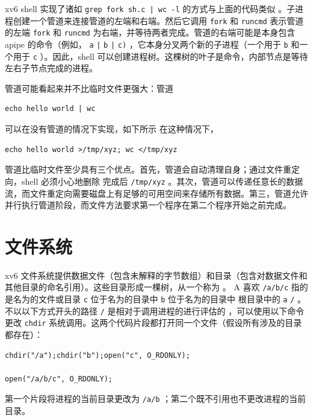 \documentclass[UTF8]{article}
\begin{document}
xv6 shell 实现了诸如
    \lstinline{grep fork sh.c | wc -l}    的方式与上面的代码类似
        。子进程创建一个管道来连接管道的左端和右端。然后它调用
    \lstinline{fork}    和
    \lstinline{runcmd}    表示管道的左端
    \lstinline{fork}    和
    \lstinline{runcmd}    为右端，并等待两者完成。管道的右端可能是本身包含 apipe 的命令（例如，
    \lstinline{a}   
    \lstinline{|}   
    \lstinline{b}   
    \lstinline{|}   
    \lstinline{c)}    ，它本身分叉两个新的子进程（一个用于
    \lstinline{b}    和一个用于
    \lstinline{c}    ）。因此，shell 可以创建进程树。这棵树的叶子是命令，内部节点是等待左右子节点完成的进程。  

管道可能看起来并不比临时文件更强大：管道
    \begin{lstlisting}[]echo hello world | wc
\end{lstlisting}    可以在没有管道的情况下实现，如下所示
 在这种情况下，   \begin{lstlisting}[]echo hello world >/tmp/xyz; wc </tmp/xyz
\end{lstlisting}    管道比临时文件至少具有三个优点。首先，管道会自动清理自身；通过文件重定向，shell 必须小心地删除
 完成后    \lstinline{/tmp/xyz}   。其次，管道可以传递任意长的数据流，而文件重定向需要磁盘上有足够的可用空间来存储所有数据。第三，管道允许并行执行管道阶段，而文件方法要求第一个程序在第二个程序开始之前完成。
    \section{文件系统  }     

xv6 文件系统提供数据文件（包含未解释的字节数组）和目录（包含对数据文件和其他目录的命名引用）。这些目录形成一棵树，从一个称为
        。 A
        喜欢
    \lstinline{/a/b/c}    指的是名为的文件或目录
    \lstinline{c}    位于名为的目录中
    \lstinline{b}    位于名为的目录中
 根目录中的    \lstinline{a}   
    \lstinline{/}   。不以以下方式开头的路径
    \lstinline{/}    是相对于调用进程的进行评估的
        ，可以使用以下命令更改
    \lstinline{chdir}    系统调用。这两个代码片段都打开同一个文件（假设所有涉及的目录都存在）：
    \begin{lstlisting}[]chdir("/a");chdir("b");open("c", O_RDONLY);

open("/a/b/c", O_RDONLY);
\end{lstlisting}    第一个片段将进程的当前目录更改为
    \lstinline{/a/b}    ；第二个既不引用也不更改进程的当前目录。  
\end{document}
